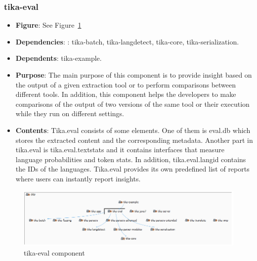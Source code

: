 \documentclass{article}
\begin{document}
\subsubsection{tika-eval}
\begin {itemize}
\item \textbf{Figure}: See Figure~\ref{fig:tika-eval}
\item \textbf{Dependencies}: : tika-batch, tika-langdetect, tika-core, tika-serialization.
\item \textbf{Dependents}: tika-example.
\item \textbf{Purpose}: The main purpose of this component is to provide insight based on the output of a given extraction tool or to perform comparisons between different tools. In addition, this component helps the developers to make comparisons of the output of two versions of the same tool or their execution while they run on different settings. 
\item \textbf{Contents}: Tika.eval consists of some elements. One of them is eval.db which stores the extracted content and the corresponding metadata. Another part in tika.eval is tika.eval.textstats and it contains interfaces that measure language probabilities and token stats.  In addition, tika.eval.langid contains the IDs of the languages. Tika.eval provides its own predefined list of reports where users can instantly report insights. 
\end{itemize}
\begin{figure}[h!]
    \centering
    \includegraphics[width=1\textwidth]{report/images/tika-eval.PNG}
    \caption{tika-eval component}
    \label{fig:tika-eval}
\end{figure}
\end{document}
